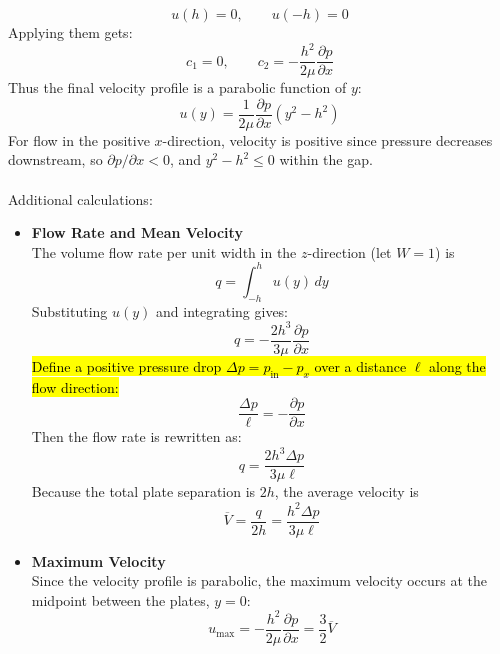 ﻿\documentclass[12pt]{article}
\begin{document}
\[
u(h)=0,\qquad u(-h)=0
\]
Applying them gets:
\[
c_1=0,\qquad c_2=-\frac{h^2}{2\mu}\frac{\partial p}{\partial x}
\]
Thus the final velocity profile is a parabolic function of $y$:
\[
\boxed{u(y)=\frac1{2\mu}\frac{\partial p}{\partial x}(y^2-h^2)}
\]
For flow in the positive $x$-direction, velocity is positive since pressure decreases downstream, so $\partial p/\partial x < 0$, and $y^2-h^2 \leq 0$ within the gap.\\\\
Additional calculations:
\begin{itemize}
    \item \textbf{Flow Rate and Mean Velocity}\\
    The volume flow rate per unit width in the \(z\)-direction (let $W=1$) is
\[
q=\int_{-h}^{h}u(y)\,dy
\]
Substituting $u(y)$ and integrating gives:
\[
\boxed{q=-\frac{2h^3}{3\mu}\frac{\partial p}{\partial x}}
\]
\hl{Define a positive pressure drop $\Delta p = p_\text{in} - p_x$ over a distance $\ell$ along the flow direction:}
\[
\frac{\Delta p}{\ell}=-\frac{\partial p}{\partial x}
\]
Then the flow rate is rewritten as:
\[
q=\frac{2h^3\Delta p}{3\mu\ell}
\]
Because the total plate separation is \(2h\), the average velocity is
\[
\boxed{\overline V=\frac{q}{2h}=\frac{h^2\Delta p}{3\mu\ell}}
\]
\item \textbf{Maximum Velocity}\\
Since the velocity profile is parabolic, the maximum velocity occurs at the midpoint between the plates, \(y=0\):
\[
u_{\max}=-\frac{h^2}{2\mu}\frac{\partial p}{\partial x} = \frac{3}{2} \overline V
\]
\end{itemize}
\end{document}
